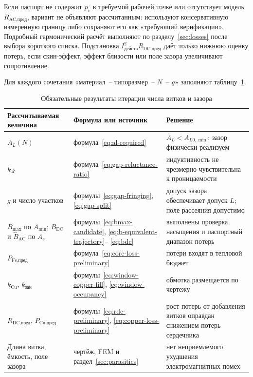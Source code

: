 \documentclass[14pt,a4paper]{extarticle}
\begin{document}
Если паспорт не содержит $p_v$ в требуемой рабочей точке или отсутствует
модель $R_{\text{AC,пред}}$, вариант не объявляют рассчитанным: используют
консервативную измеренную границу либо сохраняют его как
«требующий верификации». Подробный гармонический расчёт выполняют по
разделу~\ref{sec:losses} после выбора короткого списка. Подстановка
$I_{\text{действ}}^2R_{\text{DC,пред}}$ даёт только нижнюю оценку потерь,
если скин-эффект, эффект близости или поле зазора увеличивают сопротивление.

Для каждого сочетания «материал~-- типоразмер~-- $N$~-- $g$»
заполняют таблицу~\ref{tab:turn-gap-iteration}.

\begin{table}[H]
\caption{Обязательные результаты итерации числа витков и зазора}
\label{tab:turn-gap-iteration}
\centering
\scriptsize
\begin{tabularx}{\textwidth}{>{\raggedright\arraybackslash}p{35mm}
>{\raggedright\arraybackslash}p{53mm} X}
\toprule
Рассчитываемая величина & Формула или источник & Решение \\
\midrule
$A_L(N)$ & формула~\eqref{eq:al-required} &
$A_L<A_{L0,\min}$; зазор физически реализуем \\
$k_{\mathcal R}$ & формула~\eqref{eq:gap-reluctance-ratio} &
индуктивность не чрезмерно чувствительна к проницаемости \\
$g$ и число участков & формулы~\eqref{eq:gap-fringing},
\eqref{eq:gap-split} &
допуск зазора обеспечивает допуск $L$; поле рассеяния допустимо \\
$B_{\max}$ по $A_{\min}$; $B_{\text{DC}}$ и
$\widehat B_{\text{AC}}$ по $A_e$ &
формулы~\eqref{eq:bmax-candidate}, \eqref{eq:b-equivalent-trajectory}--
\eqref{eq:bdc} &
выполнены проверка насыщения и паспортный диапазон потерь \\
$P_{\text{Fe,пред}}$ & формула~\eqref{eq:core-loss-preliminary} &
потери входят в тепловой бюджет \\
$k_{\text{Cu}}$, $k_{\text{зан}}$ &
формулы~\eqref{eq:window-copper-fill},
\eqref{eq:window-occupancy} &
обмотка размещается по чертежу \\
$R_{\text{DC,пред}}$, $P_{\text{Cu,пред}}$ &
формулы~\eqref{eq:rdc-preliminary},
\eqref{eq:copper-loss-preliminary} &
рост потерь от добавления витков оправдан снижением потерь сердечника \\
Длина витка, ёмкость, поле зазора &
чертёж, FEM и раздел~\ref{sec:parasitics} &
нет неприемлемого ухудшения электромагнитных помех \\
\bottomrule
\end{tabularx}
\end{table}
\end{document}
